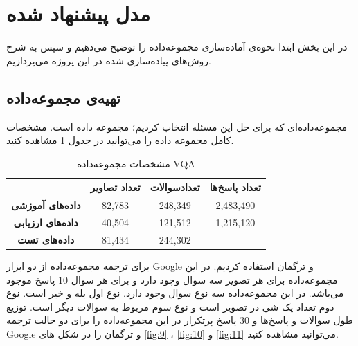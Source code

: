 \section{مدل پیشنهاد شده}
{
	در این بخش ابتدا نحوه‌ی آماده‌سازی مجموعه‌داده را توضیح می‌دهیم و سپس به شرح روش‌های پیاده‌سازی شده در این پروژه می‌پردازیم.
	
	\subsection{تهیه‌ی مجموعه‌داده}
	{
		مجموعه‌داده‌ای که برای حل این مسئله انتخاب کردیم؛ مجموعه داده
		 \href{https://visualqa.org/vqa_v1_download.html}{} 
		 است. مشخصات کامل مجموعه داده را می‌توانید در جدول 1 مشاهده کنید.
		 \begin{table}
			 \begin{center}
			 	\begin{tabular}{ c c c c } 
			 		\hline
			 		& \textbf{تعداد تصاویر} & \textbf{تعدادسوالات} & \textbf{تعداد پاسخ‌ها} \\
			 		\hline \hline
			 		\textbf{داده‌های آموزشی} & 82,783 & 248,349 &  2,483,490 \\
					
					\textbf{داده‌های ارزیابی} & 40,504 & 121,512 & 1,215,120 \\
					
					\textbf{داده‌های تست} & 81,434 & 244,302 & \\
					\hline
			 	\end{tabular}
			 \end{center}
		 \caption{مشخصات مجموعه‌داده VQA}
	 	\end{table}
		برای ترجمه مجموعه‌داده از دو ابزار Google‌ و ترگمان استفاده کردیم. در این مجموعه‌داده برای هر تصویر سه سوال وچود دارد و برای هر سوال 10 پاسخ موجود می‌باشد. در این مجموعه‌داده سه نوع سوال وجود دارد. نوع اول بله و خیر است. نوع دوم تعداد یک شی در تصویر است و نوع سوم مربوط به سوالات دیگر است. توزیع طول سوالات و پاسخ‌ها و 30 پاسخ پرتکرار در این مجموعه‌داده را برای دو حالت ترجمه Google‌‌ و ترگمان را در شکل های 
		\ref{fig:9}
		،
		\ref{fig:10}
		و 
		\ref{fig:11}
		می‌توانید مشاهده کنید. 
	}
}
